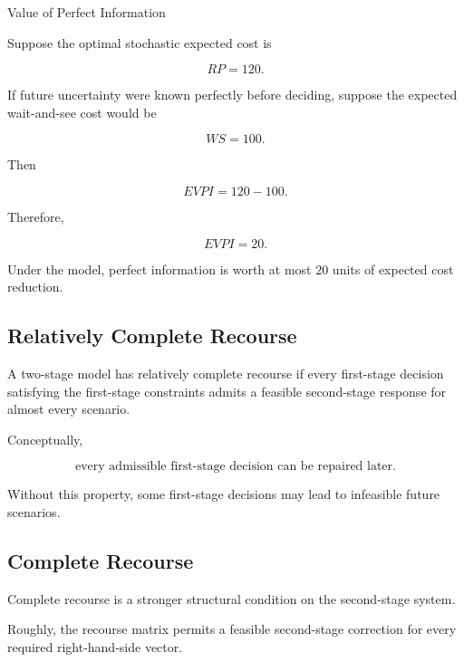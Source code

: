 \begin{workedexamplebox}{Value of Perfect Information}

Suppose the optimal stochastic expected cost is

\[
RP=120.
\]

If future uncertainty were known perfectly before deciding, suppose the
expected wait-and-see cost would be

\[
WS=100.
\]

Then

\[
EVPI
=
120-100.
\]

Therefore,

\begin{answerbox}
\[
\boxed{
EVPI=20.
}
\]
\end{answerbox}

Under the model, perfect information is worth at most \(20\) units of
expected cost reduction.

\end{workedexamplebox}

\subsection{Relatively Complete Recourse}
\label{subsec:relatively-complete-recourse}

A two-stage model has relatively complete recourse if every first-stage
decision satisfying the first-stage constraints admits a feasible
second-stage response for almost every scenario.

Conceptually,

\[
\boxed{
\text{every admissible first-stage decision can be repaired later}.
}
\]

Without this property, some first-stage decisions may lead to infeasible
future scenarios.

\subsection{Complete Recourse}
\label{subsec:complete-recourse}

Complete recourse is a stronger structural condition on the second-stage
system.

Roughly, the recourse matrix permits a feasible second-stage correction
for every required right-hand-side vector.

